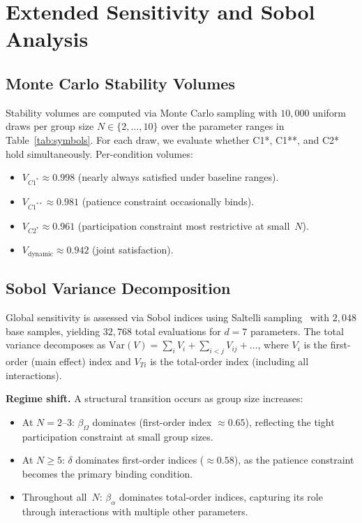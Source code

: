 \documentclass[11pt]{article}
\begin{document}

\section{Extended Sensitivity and Sobol Analysis}
\label{sec:S5}

\subsection{Monte Carlo Stability Volumes}

Stability volumes are computed via Monte Carlo sampling with $10{,}000$ uniform draws per group size $N \in \{2,\ldots,10\}$ over the parameter ranges in Table~\ref{tab:symbols}. For each draw, we evaluate whether C1*, C1**, and C2* hold simultaneously. Per-condition volumes:
\begin{itemize}
\item $V_{C1^*} \approx 0.998$ (nearly always satisfied under baseline ranges).
\item $V_{C1^{**}} \approx 0.981$ (patience constraint occasionally binds).
\item $V_{C2^*} \approx 0.961$ (participation constraint most restrictive at small~$N$).
\item $V_{\text{dynamic}} \approx 0.942$ (joint satisfaction).
\end{itemize}

\subsection{Sobol Variance Decomposition}

Global sensitivity is assessed via Sobol indices using Saltelli sampling~\cite{saltelli.2002} with $2{,}048$ base samples, yielding $32{,}768$ total evaluations for $d = 7$ parameters. The total variance decomposes as $\text{Var}(V) = \sum_i V_i + \sum_{i<j} V_{ij} + \ldots$, where $V_i$ is the first-order (main effect) index and $V_{Ti}$ is the total-order index (including all interactions).

\textbf{Regime shift.} A structural transition occurs as group size increases:
\begin{itemize}
\item At $N = 2$--$3$: $\beta_\Omega$ dominates (first-order index $\approx 0.65$), reflecting the tight participation constraint at small group sizes.
\item At $N \geq 5$: $\delta$ dominates first-order indices ($\approx 0.58$), as the patience constraint becomes the primary binding condition.
\item Throughout all~$N$: $\beta_\alpha$ dominates total-order indices, capturing its role through interactions with multiple other parameters.
\end{itemize}
\end{document}

